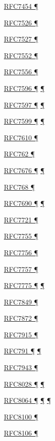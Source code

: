 \documentclass[
]{article}
\begin{document}
\hyperref[filtering]{RFC7454 ¶}

\hyperref[obsolete-techniques]{RFC7526 ¶}

\hyperref[auto-configuration]{RFC7527 ¶}

\hyperref[tunnels]{RFC7552 ¶}

\hyperref[multihoming]{RFC7556 ¶}

\hyperref[dual-stack-scenarios]{RFC7596 ¶}
\hyperref[translation-and-ipv4-as-a-service]{¶}

\hyperref[dual-stack-scenarios]{RFC7597 ¶}
\hyperref[translation-and-ipv4-as-a-service]{¶}

\hyperref[dual-stack-scenarios]{RFC7599 ¶}
\hyperref[translation-and-ipv4-as-a-service]{¶}

\hyperref[layer-2-considerations]{RFC7610 ¶}

\hyperref[why-version-6]{RFC762 ¶}

\hyperref[layer-2-functions]{RFC7676 ¶} \hyperref[tunnels]{¶}

\hyperref[transport-protocols]{RFC768 ¶}

\hyperref[extension-headers-and-options]{RFC7690 ¶}
\hyperref[packet-size-and-jumbo-frames]{¶}

\hyperref[security-operation]{RFC7721 ¶}

\hyperref[translation-and-ipv4-as-a-service]{RFC7755 ¶}

\hyperref[translation-and-ipv4-as-a-service]{RFC7756 ¶}

\hyperref[translation-and-ipv4-as-a-service]{RFC7757 ¶}

\hyperref[routing]{RFC7775 ¶} \hyperref[routing-operation]{¶}

\hyperref[layer-2-considerations]{RFC7849 ¶}

\hyperref[extension-headers-and-options]{RFC7872 ¶}

\hyperref[translation-and-ipv4-as-a-service]{RFC7915 ¶}

\hyperref[why-version-6]{RFC791 ¶}
\hyperref[traffic-class-and-flow-label]{¶}

\hyperref[security-operation]{RFC7943 ¶}

\hyperref[auto-configuration]{RFC8028 ¶}
\hyperref[multi-prefix-operation]{¶}

\hyperref[addresses]{RFC8064 ¶} \hyperref[auto-configuration]{¶}
\hyperref[layer-2-functions]{¶}

\hyperref[traffic-class-and-flow-label]{RFC8100 ¶}

\hyperref[auto-configuration]{RFC8106 ¶}
\end{document}
